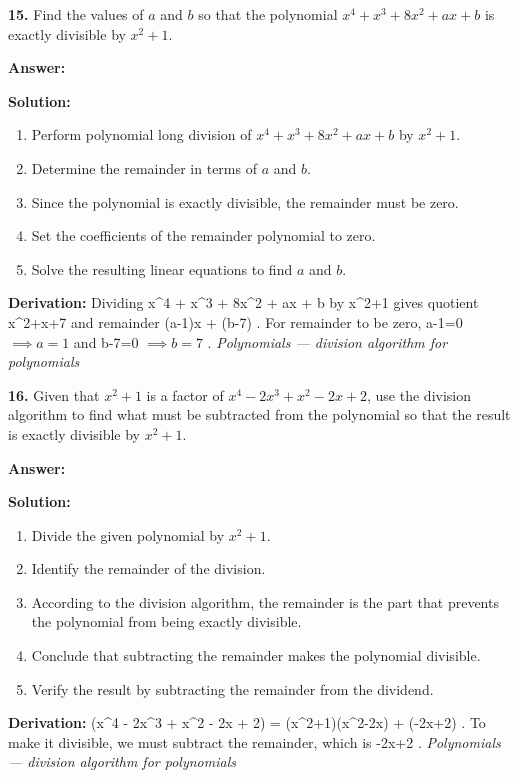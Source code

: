 \documentclass[12pt,a4paper]{exam}
\newcommand{\fitmath}[1]{%
  \sbox{\schmathbox}{$\displaystyle #1$}%
  \ifdim\wd\schmathbox>\linewidth
    \resizebox{\linewidth}{!}{\usebox{\schmathbox}}%
  \else
    \usebox{\schmathbox}%
  \fi}
\begin{document}
\begin{questions}
\question \textbf{15.} Find the values of $a$ and $b$ so that the polynomial $x^4 + x^3 + 8x^2 + ax + b$ is exactly divisible by $x^2 + 1$.

\textbf{Answer:}
\begin{center}
\fitmath{a = 1, b = 7}
\end{center}

\textbf{Solution:}
\begin{enumerate}
  \item Perform polynomial long division of $x^4 + x^3 + 8x^2 + ax + b$ by $x^2 + 1$.
  \item Determine the remainder in terms of $a$ and $b$.
  \item Since the polynomial is exactly divisible, the remainder must be zero.
  \item Set the coefficients of the remainder polynomial to zero.
  \item Solve the resulting linear equations to find $a$ and $b$.
\end{enumerate}
\textbf{Derivation:}
Dividing  x\textasciicircum{}4 + x\textasciicircum{}3 + 8x\textasciicircum{}2 + ax + b  by  x\textasciicircum{}2+1  gives quotient  x\textasciicircum{}2+x+7  and remainder  (a-1)x + (b-7) . For remainder to be zero,  a-1=0 $\implies a=1$  and  b-7=0 $\implies b=7$ .
\hfill \textit{Polynomials — division algorithm for polynomials}
\vspace{0.3cm}

\question \textbf{16.} Given that $x^2 + 1$ is a factor of $x^4 - 2x^3 + x^2 - 2x + 2$, use the division algorithm to find what must be subtracted from the polynomial so that the result is exactly divisible by $x^2 + 1$.

\textbf{Answer:}
\begin{center}
\fitmath{\text{Subtracting} -2x + 2}
\end{center}

\textbf{Solution:}
\begin{enumerate}
  \item Divide the given polynomial by $x^2 + 1$.
  \item Identify the remainder of the division.
  \item According to the division algorithm, the remainder is the part that prevents the polynomial from being exactly divisible.
  \item Conclude that subtracting the remainder makes the polynomial divisible.
  \item Verify the result by subtracting the remainder from the dividend.
\end{enumerate}
\textbf{Derivation:}
 (x\textasciicircum{}4 - 2x\textasciicircum{}3 + x\textasciicircum{}2 - 2x + 2) = (x\textasciicircum{}2+1)(x\textasciicircum{}2-2x) + (-2x+2) . To make it divisible, we must subtract the remainder, which is  -2x+2 .
\hfill \textit{Polynomials — division algorithm for polynomials}
\vspace{0.3cm}


\end{questions}
\end{document}
